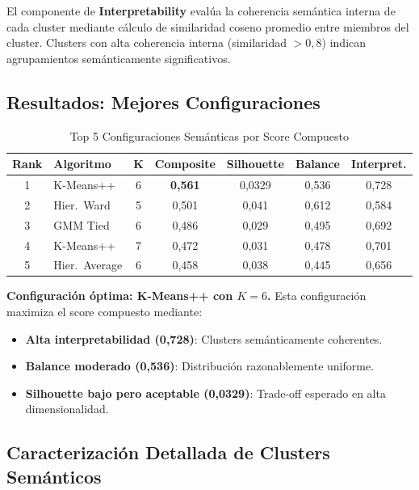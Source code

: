 El componente de \textbf{Interpretability} evalúa la coherencia semántica interna de cada cluster mediante cálculo de similaridad coseno promedio entre miembros del cluster. Clusters con alta coherencia interna (similaridad $> 0{,}8$) indican agrupamientos semánticamente significativos.

\subsection{Resultados: Mejores Configuraciones}
\label{subsec:resultados-fase3}

\begin{table}[htbp]
\centering
\caption{Top 5 Configuraciones Semánticas por Score Compuesto}
\label{tab:top5-configuraciones}
\begin{tabular}{clccccc}
\toprule
\textbf{Rank} & \textbf{Algoritmo} & \textbf{K} & \textbf{Composite} & \textbf{Silhouette} & \textbf{Balance} & \textbf{Interpret.} \\
\midrule
1 & K-Means++ & 6 & \textbf{0,561} & 0,0329 & 0,536 & 0,728 \\
2 & Hier.\ Ward & 5 & 0,501 & 0,041 & 0,612 & 0,584 \\
3 & GMM Tied & 6 & 0,486 & 0,029 & 0,495 & 0,692 \\
4 & K-Means++ & 7 & 0,472 & 0,031 & 0,478 & 0,701 \\
5 & Hier.\ Average & 6 & 0,458 & 0,038 & 0,445 & 0,656 \\
\bottomrule
\end{tabular}
\end{table}

\textbf{Configuración óptima: K-Means++ con $K=6$.} Esta configuración maximiza el score compuesto mediante:
\begin{itemize}
    \item \textbf{Alta interpretabilidad (0,728)}: Clusters semánticamente coherentes.
    \item \textbf{Balance moderado (0,536)}: Distribución razonablemente uniforme.
    \item \textbf{Silhouette bajo pero aceptable (0,0329)}: Trade-off esperado en alta dimensionalidad.
\end{itemize}

\subsection{Caracterización Detallada de Clusters Semánticos}
\label{subsec:caracterizacion-clusters}

